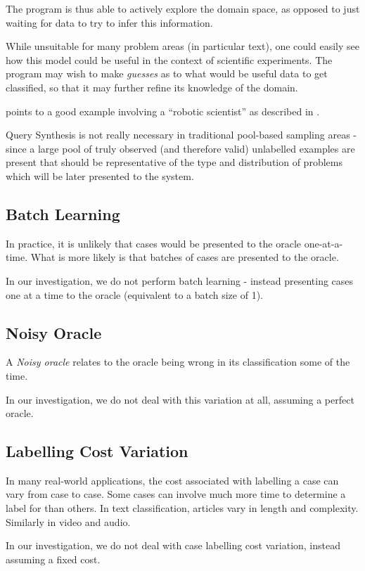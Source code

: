 \documentclass[a4paper,11pt]{report}
\begin{document}
The program is thus able to actively explore the domain space, as opposed to just waiting for data to try to infer this information.

While unsuitable for many problem areas (in particular text), one could easily see how this model could be useful in the context of scientific experiments. The program may wish to make \emph{guesses} as to what would be useful data to get classified, so that it may further refine its knowledge of the domain.

\citet{Settles2010} points to a good example involving a ``robotic scientist'' as described in \citet{King2009}.

Query Synthesis is not really necessary in traditional pool-based sampling areas - since a large pool of truly observed (and therefore valid) unlabelled examples are present that should be representative of the type and distribution of problems which will be later presented to the system.

\subsection{Batch Learning}
In practice, it is unlikely that cases would be presented to the oracle one-at-a-time. What is more likely is that batches of cases are presented to the oracle.

In our investigation, we do not perform batch learning - instead presenting cases one at a time to the oracle (equivalent to a batch size of 1).

\subsection{Noisy Oracle}
A \emph{Noisy oracle} relates to the oracle being wrong in its classification some of the time.

In our investigation, we do not deal with this variation at all, assuming a perfect oracle.

\subsection{Labelling Cost Variation}
In many real-world applications, the cost associated with labelling a case can vary from case to case. Some cases can involve much more time to determine a label for than others. In text classification, articles vary in length and complexity. Similarly in video and audio.

In our investigation, we do not deal with case labelling cost variation, instead assuming a fixed cost.
\end{document}
